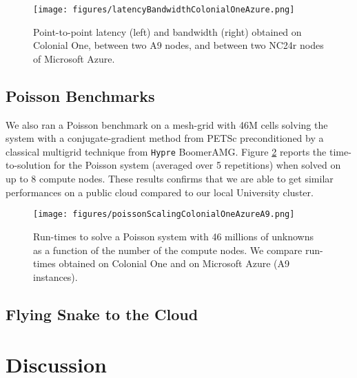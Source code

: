 \documentclass[12pt]{article}
\newcommand{\hypre}{\texttt{Hypre} }
\begin{document}
\begin{figure}[h!]
\centering
\texttt{[image: figures/latencyBandwidthColonialOneAzure.png]}
\caption{Point-to-point latency (left) and bandwidth (right) obtained on Colonial One, between two A9 nodes, and between two NC24r nodes of Microsoft Azure.}
\label{latency_bandwidth_colonialone_azure}
\end{figure}

\subsection{Poisson Benchmarks}

We also ran a Poisson benchmark on a mesh-grid with 46M cells solving the system with a conjugate-gradient method from PETSc preconditioned by a classical multigrid technique from \hypre BoomerAMG.
Figure \ref{poisson_colonialone_azurea9} reports the time-to-solution for the Poisson system (averaged over 5 repetitions) when solved on up to 8 compute nodes.
These results confirms that we are able to get similar performances on a public cloud compared to our local University cluster.

\begin{figure}[h!]
\centering
\texttt{[image: figures/poissonScalingColonialOneAzureA9.png]}
\caption{Run-times to solve a Poisson system with 46 millions of unknowns as a function of the number of the compute nodes. We compare run-times obtained on Colonial One and on Microsoft Azure (A9 instances).}
\label{poisson_colonialone_azurea9}
\end{figure}

\subsection{Flying Snake to the Cloud}


\section{Discussion}
\end{document}
